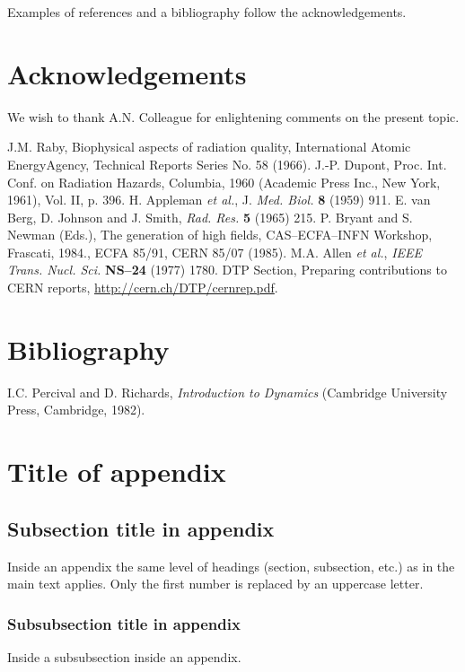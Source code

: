 Examples of references and a bibliography follow the acknowledgements.

\section{Acknowledgements}

We wish to thank A.N. Colleague for enlightening comments on
the present topic.

\begin{thebibliography}{99}
J.M. Raby, Biophysical aspects of radiation quality, International 
Atomic EnergyAgency, Technical Reports Series No. 58 (1966).
J.-P. Dupont, Proc. Int. Conf. on Radiation Hazards, Columbia, 
1960 (Academic Press Inc., New York, 1961), Vol. II, p. 396.
H. Appleman \emph{et al.}, J. \emph{Med. Biol.} \textbf{8} (1959) 911.
E. van Berg, D. Johnson and J. Smith, \emph{Rad. Res.} \textbf{5} (1965) 
215.
P. Bryant and S. Newman (Eds.), The generation of high fields, 
CAS--ECFA--INFN Workshop, Frascati, 1984., ECFA 85/91, CERN 85/07 
(1985).
M.A. Allen \emph{et al.}, \emph{IEEE Trans. Nucl. Sci.} \textbf{NS--24} (1977) 
1780.
DTP Section, Preparing contributions to CERN reports,
\url{http://cern.ch/DTP/cernrep.pdf}.
\end{thebibliography}

\section{Bibliography}


I.C. Percival and D. Richards, \emph{Introduction to Dynamics}
(Cambridge University Press, Cambridge, 1982).

\appendix
\section{Title of appendix}
\label{sec:app}

\subsection{Subsection title in appendix}

Inside an appendix the same level of headings (section, subsection,
etc.) as in the main text applies. Only the first number is replaced
by an uppercase letter.

\subsubsection{Subsubsection title in appendix}

Inside a subsubsection inside an appendix.



